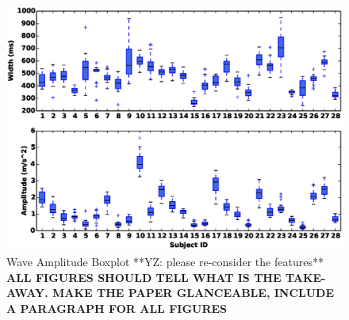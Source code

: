 \begin{figure}
\includegraphics[width=\columnwidth]{figure/width_amp_box.eps}
\centering
\caption{\label{fig:width_amp} Wave Amplitude Boxplot **YZ: please re-consider the features** \textbf{ALL FIGURES SHOULD TELL WHAT IS THE TAKE-AWAY. MAKE THE PAPER GLANCEABLE, INCLUDE A PARAGRAPH FOR ALL FIGURES}}
\end{figure}

